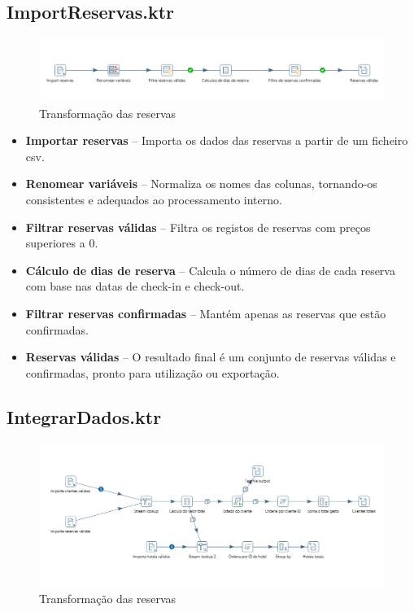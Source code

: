 \documentclass[a4paper, 12pt]{article} %
\begin{document}
\newpage

\subsection{ImportReservas.ktr}

\begin{figure}[h] 
	\centering 
	\includegraphics[width=1\textwidth]{images/reservas.png}
	\caption{Transformação das reservas}
	\label{fig:transformacao_reservas}
\end{figure}

\begin{itemize}
	\item \textbf{Importar reservas} – Importa os dados das reservas a partir de um ficheiro csv.
	\item \textbf{Renomear variáveis} – Normaliza os nomes das colunas, tornando-os consistentes e adequados ao processamento interno.
	\item \textbf{Filtrar reservas válidas} – Filtra os registos de reservas com preços superiores a 0.
	\item \textbf{Cálculo de dias de reserva} – Calcula o número de dias de cada reserva com base nas datas de check-in e check-out.
	\item \textbf{Filtrar reservas confirmadas} – Mantém apenas as reservas que estão confirmadas.
	\item \textbf{Reservas válidas} – O resultado final é um conjunto de reservas válidas e confirmadas, pronto para utilização ou exportação.
\end{itemize}
\newpage
\subsection{IntegrarDados.ktr}

\begin{figure}[h] 
	\centering 
	\includegraphics[width=1\textwidth]{images/integrar_dados.png}
	\caption{Transformação das reservas}
	\label{fig:transformacao_integrar_dados}
\end{figure}
\end{document}
